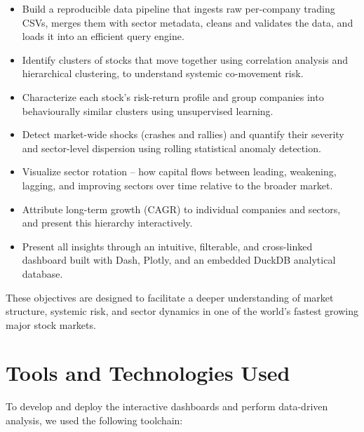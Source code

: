 \documentclass[14pt,a4paper]{extreport}
\begin{document}
\begin{itemize}
    \item Build a reproducible data pipeline that ingests raw per-company
        trading CSVs, merges them with sector metadata, cleans and validates
        the data, and loads it into an efficient query engine.
    \item Identify clusters of stocks that move together using correlation
        analysis and hierarchical clustering, to understand systemic
        co-movement risk.
    \item Characterize each stock's risk-return profile and group companies
        into behaviourally similar clusters using unsupervised learning.
    \item Detect market-wide shocks (crashes and rallies) and quantify their
        severity and sector-level dispersion using rolling statistical
        anomaly detection.
    \item Visualize sector rotation -- how capital flows between leading,
        weakening, lagging, and improving sectors over time relative to the
        broader market.
    \item Attribute long-term growth (CAGR) to individual companies and
        sectors, and present this hierarchy interactively.
    \item Present all insights through an intuitive, filterable, and
        cross-linked dashboard built with Dash, Plotly, and an embedded
        DuckDB analytical database.
\end{itemize}

These objectives are designed to facilitate a deeper understanding of market
structure, systemic risk, and sector dynamics in one of the world's fastest
growing major stock markets.

\chapter{Tools and Technologies Used}

To develop and deploy the interactive dashboards and perform data-driven
analysis, we used the following toolchain:
\end{document}
